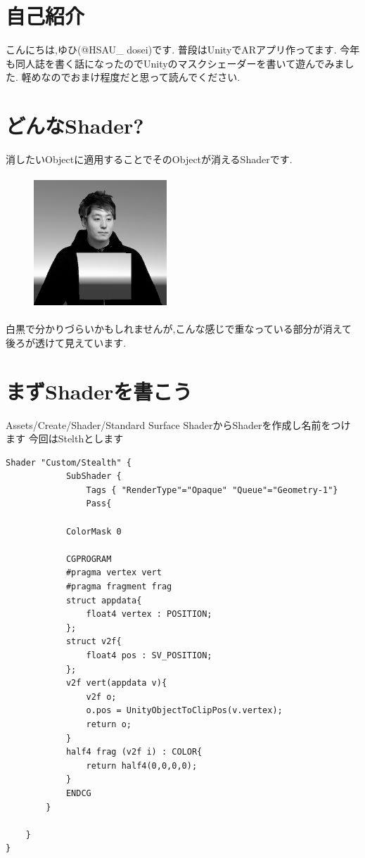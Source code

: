 \section{自己紹介}
こんにちは,ゆひ(@HSAU\_ dosei)です. 普段はUnityでARアプリ作ってます. 今年も同人誌を書く話になったのでUnityのマスクシェーダーを書いて遊んでみました. 軽めなのでおまけ程度だと思って読んでください.
\section{どんなShader?}
消したいObjectに適用することでそのObjectが消えるShaderです.

\begin{figure}[htbp]
\centering
\includegraphics[width=5cm,height=5cm]{./assets/yuhiasset/hsau_dosei2.png}
\end{figure}

白黒で分かりづらいかもしれませんが,こんな感じで重なっている部分が消えて後ろが透けて見えています.

\section{まずShaderを書こう}
Assets/Create/Shader/Standard Surface ShaderからShaderを作成し名前をつけます
今回はStelthとします

\begin{verbatim}
Shader "Custom/Stealth" {
            SubShader {
                Tags { "RenderType"="Opaque" "Queue"="Geometry-1"}
                Pass{

            ColorMask 0

            CGPROGRAM
            #pragma vertex vert
            #pragma fragment frag
            struct appdata{
                float4 vertex : POSITION;
            };
            struct v2f{
                float4 pos : SV_POSITION;
            };
            v2f vert(appdata v){
                v2f o;
                o.pos = UnityObjectToClipPos(v.vertex);
                return o;
            }
            half4 frag (v2f i) : COLOR{
                return half4(0,0,0,0);
            }
            ENDCG
        }
        
    }
}
\end{verbatim}

